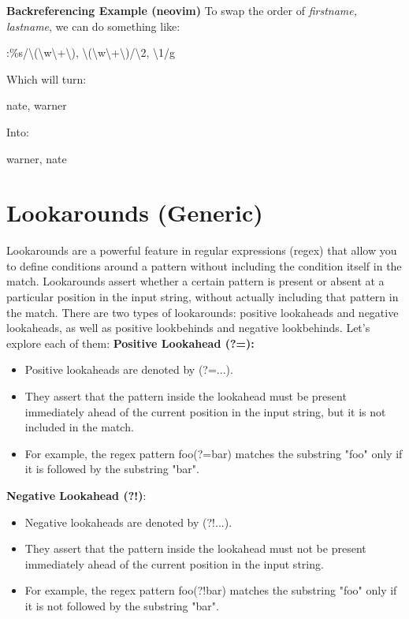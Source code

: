 \documentclass{report}
\begin{document}
    \bigbreak \noindent 
    \textbf{Backreferencing Example (neovim)}
    \bigbreak \noindent 
    To swap the order of \textit{firstname, lastname}, we can do something like:
    \begin{center}
        :\%s/\textbackslash(\textbackslash w\textbackslash +\textbackslash ), \textbackslash(\textbackslash w\textbackslash +\textbackslash )/\textbackslash 2, \textbackslash 1/g
    \end{center}
    Which will turn:
    \begin{center}
        nate, warner
    \end{center}
    Into:
    \begin{center}
        warner, nate
    \end{center}



    \pagebreak
    \bigbreak
    \noindent

    \section{Lookarounds (Generic)}
    \bigbreak \noindent 
    Lookarounds are a powerful feature in regular expressions (regex) that allow you to define conditions around a pattern without including the condition itself in the match. Lookarounds assert whether a certain pattern is present or absent at a particular position in the input string, without actually including that pattern in the match. There are two types of lookarounds: positive lookaheads and negative lookaheads, as well as positive lookbehinds and negative lookbehinds. Let's explore each of them:
    \bigbreak \noindent 
    \textbf{Positive Lookahead (?=):}
    \begin{itemize}
        \item Positive lookaheads are denoted by (?=...).
        \item They assert that the pattern inside the lookahead must be present immediately ahead of the current position in the input string, but it is not included in the match.
        \item For example, the regex pattern foo(?=bar) matches the substring "foo" only if it is followed by the substring "bar".
    \end{itemize}
    \bigbreak \noindent 
    \textbf{Negative Lookahead (?!)}:

    \begin{itemize}
        \item Negative lookaheads are denoted by (?!...).
        \item They assert that the pattern inside the lookahead must not be present immediately ahead of the current position in the input string.
        \item For example, the regex pattern foo(?!bar) matches the substring "foo" only if it is not followed by the substring "bar".
    \end{itemize}
\end{document}
